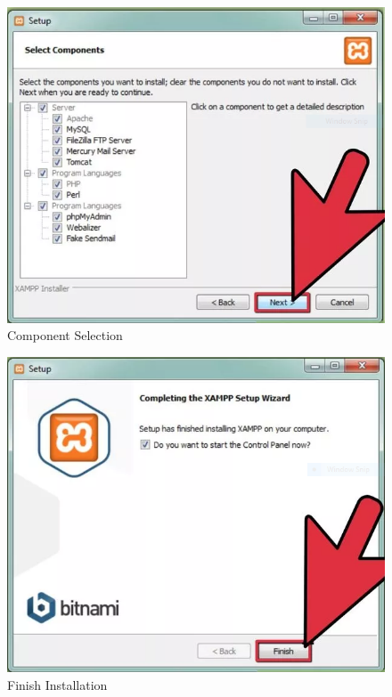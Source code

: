 \documentclass[a4paper,12pt,oneside]{book}
\begin{document}
\begin{enumerate}
\begin{enumerate}
						\begin{figure}[H]  \centering
							\includegraphics[width=13cm]{xampp1.png}
							\caption{Component Selection}
						\end{figure}
						\begin{figure}[H]  \centering
							\includegraphics[width=13cm]{xampp12.png}
							\caption{Finish Installation}
						\end{figure}
						\begin{figure}[H]  \centering

\end{figure}
\end{enumerate}
\end{enumerate}
\end{document}
